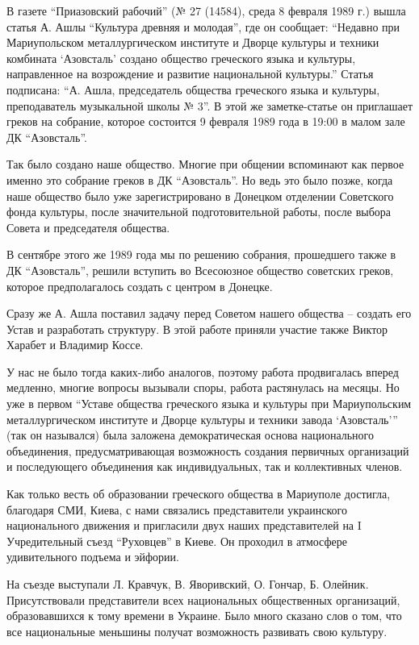 В газете \enquote{Приазовский рабочий} (№ 27 (14584), среда 8 февраля 1989 г.) вышла
статья А. Ашлы \enquote{Культура древняя и молодая}, где он сообщает: \enquote{Недавно при
Мариупольском металлургическом институте и Дворце культуры и техники комбината
\enquote{Азовсталь} создано общество греческого языка и культуры, направленное на
возрождение и развитие национальной культуры.} Статья подписана: \enquote{А. Ашла,
председатель общества греческого языка и культуры, преподаватель музыкальной
школы № 3}. В этой же заметке-статье он приглашает греков на собрание, которое
состоится 9 февраля 1989 года в 19:00 в малом зале ДК \enquote{Азовсталь}.     

Так было создано наше общество. Многие при общении вспоминают как первое именно
это собрание греков в ДК \enquote{Азовсталь}. Но ведь это было позже, когда наше
общество было уже зарегистрировано в Донецком отделении Советского фонда
культуры, после значительной подготовительной работы, после выбора Совета и
председателя общества. 

В сентябре этого же 1989 года мы по решению собрания, прошедшего также в ДК
\enquote{Азовсталь}, решили вступить во Всесоюзное общество советских греков, которое
предполагалось создать с центром в Донецке. 

Сразу же А. Ашла поставил задачу перед Советом нашего общества – создать  его
Устав и разработать структуру.  В этой работе приняли участие также Виктор
Харабет и Владимир Коссе. 

У нас не было тогда каких-либо аналогов, поэтому работа продвигалась вперед
медленно, многие вопросы вызывали споры, работа растянулась на месяцы. Но уже в
первом \enquote{Уставе общества греческого языка и культуры при Мариупольским
металлургическом институте и Дворце культуры и техники завода \enquote{Азовсталь}} (так
он назывался) была заложена демократическая основа национального объединения,
предусматривающая возможность создания первичных организаций и последующего
объединения как индивидуальных, так и коллективных членов.

Как только весть об образовании греческого общества в Мариуполе достигла,
благодаря СМИ, Киева, с нами связались представители украинского национального
движения и пригласили двух наших представителей на I Учредительный съезд
\enquote{Руховцев} в Киеве. Он проходил в атмосфере удивительного подъема и эйфории. 

На съезде выступали  Л. Кравчук, В. Яворивский, О. Гончар, Б. Олейник.
Присутствовали представители всех национальных общественных организаций,
образовавшихся к тому времени в Украине. Было много сказано слов о том, что все
национальные меньшины получат возможность развивать свою культуру.

